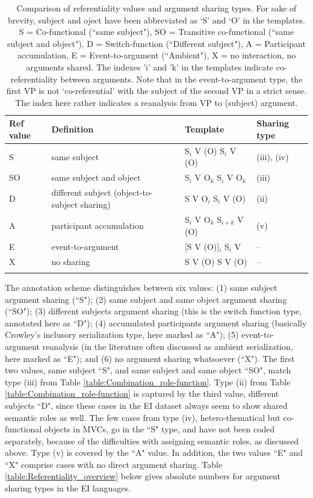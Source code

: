 \begin{table}
\begin{tabular}{l p{4cm} l l}
\lsptoprule
Ref value & Definition & Template & Sharing type \\ 
\midrule 
S & same subject & S$_i$ V (O) S$_i$ V (O) &  (iii), (iv) \\ 
SO & same subject and object & S$_i$ V O$_k$ S$_i$ V O$_k$ & (iii) \\ 
D & different subject (object-to-subject sharing) & S V O$_i$ S$_i$ V (O) & (ii) \\ 
A & participant accumulation & S$_i$ V O$_k$ S$_{i+k}$ V (O) & (v) \\  
E & event-to-argument & [S V (O)]$_i$ S$_i$ V & -- \\ 
X & no sharing & S V (O) S V (O) & -- \\ 
\lspbottomrule 
\end{tabular} 
\caption[Comparison of referentiality and argument sharing types]{Comparison of referentiality values and argument sharing types. For sake of brevity, subject and oject have been abbreviated as `S' and `O' in the templates. S = Co-functional (``same subject"), SO = Transitive co-functional (``same subject and object"), D = Switch-function (``Different subject"), A = Participant accumulation, E = Event-to-argument (``Ambient"), X = no interaction, no arguments shared. The indexes 'i' and 'k' in the templates indicate co-referentiality between arguments. Note that in the event-to-argument type, the first VP is not `co-referential' with the subject of the second VP in a strict sense. The index here rather indicates a reanalysis from VP to (subject) argument.}
\label{table:comparison_ref-sharing}
\end{table}

The annotation scheme distinguishes between six values: (1) same subject argument sharing (``S"); (2) same subject and same object argument sharing (``SO"); (3) different subjects argument sharing (this is the switch function type, annotated here as ``D"); (4) accumulated participants argument sharing (basically Crowley's inclusory serialization type, here marked as ``A"); (5) event-to-argument reanalysis (in the literature often discussed as ambient serialization, here marked as ``E"); and (6) no argument sharing whatsoever (``X"). The first two values, same subject ``S", and same subject and same object ``SO", match type (iii) from Table \ref{table:Combination_role-function}. Type (ii) from Table \ref{table:Combination_role-function} is captured by the third value, different subjects ``D", since these cases in the EI dataset always seem to show shared semantic roles as well. The few cases from type (iv), hetero-thematical but co-functional objects in MVCs, go in the ``S" type, and have not been coded separately, because of the difficulties with assigning semantic roles, as discussed above. Type (v) is covered by the ``A" value. In addition, the two values ``E" and ``X" comprise cases with no direct argument sharing. Table \ref{table:Referentiality_overview} below gives absolute numbers  for argument sharing types in the EI languages.

